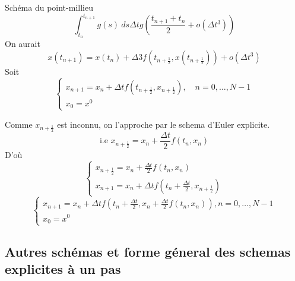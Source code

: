 \begin{remark}
   Schéma du point-millieu
   \[
   \int_{{t_n}}^{{t_{n+1}}} {g(s)} \: d{s} {\Delta t g(\frac{t_{n+1} + t_n}{2} + o(\Delta t^3))}
   \] 
   On aurait \[
       x(t_{n+1}) = x(t_n) + \Delta 3 f(t_{n + \frac{1}{2}}, x(t_{n + \frac{1}{2}})) + o(\Delta t^3)
   \] 
   Soit 
   \[
   \begin{cases}
       x_{n+1} = x_n + \Delta t f(t_{n + \frac{1}{2}}, x_{n + \frac{1}{2}}),  \quad n = 0, \ldots, N-1\\
       x_0 = x^0
   \end{cases}
   \] 

   Comme $x_{n + \frac{1}{2}}$ est inconnu, on l'approche par le schema d'Euler explicite.
   \[
   \text{i.e } x_{n+\frac{1}{2}} = x_n + \frac{\Delta t}{2} f(t_n, x_n)
   \] 
   D'où
   \begin{equation}
       \begin{cases}
           x_{n + \frac{1}{2}} = x_n + \frac{\Delta t}{2}f(t_n, x_n)\\
           x_{n+1} = x_n + \Delta t f(t_n + \frac{\Delta t}{2}, x_{n+ \frac{1}{2}})
       \end{cases}
   \end{equation}
   \begin{equation}
       \begin{cases}
           x_{n+1} = x_n + \Delta t f(t_n + \frac{\Delta t}{2}, x_n + \frac{\Delta t}{2}f(t_n , x_n)), n = 0, \ldots, N-1\\
           x_0 = x^0
       \end{cases}
   \end{equation}
\end{remark}

\subsection{Autres schémas et forme géneral des schemas explicites à un pas}


